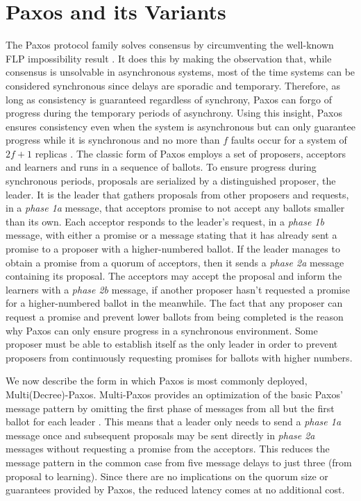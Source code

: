 \section{Paxos and its Variants} \label{Paxos} 
The Paxos protocol family solves consensus by circumventing the well-known FLP impossibility result \cite{Fischer1985}. It does this by making the observation that, while consensus is unsolvable in asynchronous systems, most of the time systems can be considered synchronous since delays are sporadic and temporary. Therefore, as long as consistency is guaranteed regardless of synchrony, Paxos can forgo of progress during the temporary periods of asynchrony. Using this insight, Paxos ensures consistency even when the system is asynchronous but can only guarantee progress while it is synchronous and no more than $f$ faults occur for a system of $2f+1$ replicas \cite{Lamport2001}. The classic form of Paxos employs a set of proposers, acceptors and learners and runs in a sequence of ballots. To ensure progress during synchronous periods, proposals are serialized by a distinguished proposer, the leader. It is the leader that gathers proposals from other proposers and requests, in a \textit{phase 1a} message, that acceptors promise to not accept any ballots smaller than its own. Each acceptor responds to the leader's request, in a \textit{phase 1b} message, with either a promise or a message stating that it has already sent a promise to a proposer with a higher-numbered ballot. If the leader manages to obtain a promise from a quorum of acceptors, then it sends a \textit{phase 2a} message containing its proposal. The acceptors may accept the proposal and inform the learners with a \textit{phase 2b} message, if another proposer hasn't requested a promise for a higher-numbered ballot in the meanwhile. The fact that any proposer can request a promise and prevent lower ballots from being completed is the reason why Paxos can only ensure progress in a synchronous environment. Some proposer must be able to establish itself as the only leader in order to prevent proposers from continuously requesting promises for ballots with higher numbers. \par
We now describe the form in which Paxos is most commonly deployed, Multi(Decree)-Paxos. Multi-Paxos provides an optimization of the basic Paxos' message pattern by omitting the first phase of messages from all but the first ballot for each leader \cite{Renesse2011}. This means that a leader only needs to send a \textit{phase 1a} message once and subsequent proposals may be sent directly in \textit{phase 2a} messages without requesting a promise from the acceptors. This reduces the message pattern in the common case from five message delays to just three (from proposal to learning). Since there are no implications on the quorum size or guarantees provided by Paxos, the reduced latency comes at no additional cost. \par

